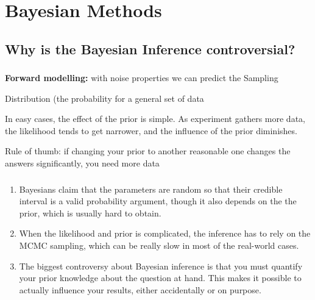 \documentclass[c, dvipsnames]{beamer}  %
\begin{document}
\section{Bayesian Methods}





\subsection{Why is the Bayesian Inference controversial?}

\begin{frame}[shrink=5]
\frametitle{\insertsection} 

\textbf{Forward	modelling:	}   with
  noise	
properties	
  we	
 can	 predict	
  the	Sampling	
  
Distribution
   (the probability	
  for	
  a	
 general	
  set	
  of	
 data


In	
  easy	
  cases,	
  the	
  effect	
  of	
  the	
  prior	
  is	
  simple. As	
  experiment	
  gathers	
  more	
  data,	
  the	
  likelihood	
  tends	
  to	
  get	
  narrower,	
  and	
  the	
  influence	
  of	
  the	
  prior	
  diminishes.	
  

Rule	
  of	
  thumb:	
  if	
  changing	
  your	
  prior	
  to	
  another	
  reasonable	
 one	
  changes	
  the	
  answers	
  significantly,	
  you	
  need	
  more	
  data	
  



\end{frame}





\begin{frame}[shrink=5]
\frametitle{\insertsection} 
\framesubtitle{\insertsubsection}


\begin{enumerate}
	\item  Bayesians claim that the parameters are random so that their credible interval is a valid probability argument, though it also depends on the  the prior, which is usually hard to obtain.
	
	\item When the likelihood and prior is complicated, the inference has to rely on the MCMC sampling, which can be really slow in most of the real-world cases.

	\item  The biggest controversy about Bayesian inference is that you must quantify your prior knowledge about the question at hand. This makes it possible to actually influence your results, either accidentally or on purpose. 	
\end{enumerate}
\end{frame}
\end{document}
